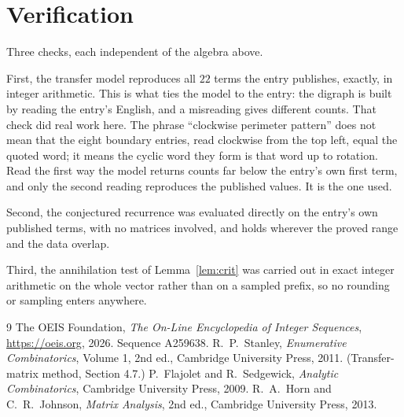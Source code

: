 \documentclass[11pt,a4paper]{article}
\theoremstyle{plain}
\theoremstyle{definition}
\begin{document}
\section{Verification}

Three checks, each independent of the algebra above.

First, the transfer model reproduces all $22$ terms the entry publishes, exactly, in
integer arithmetic. This is what ties the model to the entry: the digraph is built by reading
the entry's English, and a misreading gives different counts. That check did real work here. The phrase ``clockwise perimeter pattern'' does not mean that the eight boundary entries, read clockwise from the top left, equal the quoted word; it means the cyclic word they form is that word up to rotation. Read the first way the model returns counts far below the entry's own first term, and only the second reading reproduces the published values. It is the one used.

Second, the conjectured recurrence was evaluated directly on the entry's own published terms,
with no matrices involved, and holds wherever the proved range and the data overlap.

Third, the annihilation test of Lemma~\ref{lem:crit} was carried out in exact integer
arithmetic on the whole vector rather than on a sampled prefix, so no rounding or sampling
enters anywhere.

\begin{thebibliography}{9}
 The OEIS Foundation, \emph{The On-Line Encyclopedia of Integer
Sequences}, \url{https://oeis.org}, 2026. Sequence A259638.
 R.~P.~Stanley, \emph{Enumerative Combinatorics}, Volume 1, 2nd ed.,
Cambridge University Press, 2011. (Transfer-matrix method, Section 4.7.)
 P.~Flajolet and R.~Sedgewick, \emph{Analytic Combinatorics}, Cambridge
University Press, 2009.
 R.~A.~Horn and C.~R.~Johnson, \emph{Matrix Analysis}, 2nd ed., Cambridge
University Press, 2013.
\end{thebibliography}
\end{document}
